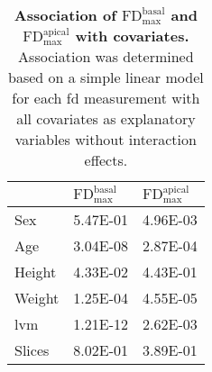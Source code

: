 \begin{table}[htbp]
  \centering
  \caption[\textbf{Association of \(\text{FD}_\text{max}^\text{basal}\) and \(\text{FD}_\text{max}^\text{apical}\) with covariates. }]{\textbf{Association of \(\text{FD}_\text{max}^\text{basal}\) and \(\text{FD}_\text{max}^\text{apical}\) with covariates. } Association was determined based on a simple linear model for each \gls{fd} measurement with all covariates as explanatory variables without interaction effects.}
    \begin{tabular}{lll}
    \toprule
          &  \(\text{FD}_\text{max}^\text{basal}\) & \(\text{FD}_\text{max}^\text{apical}\) \\
    \midrule
    Sex   & \num{5.47E-01} & \num{4.96E-03} \\
    Age   & \num{3.04E-08} & \num{2.87E-04} \\
    Height & \num{4.33E-02} & \num{4.43E-01} \\
    Weight & \num{1.25E-04} & \num{4.55E-05} \\
    \gls{lvm}   & \num{1.21E-12} & \num{2.62E-03} \\
    Slices & \num{8.02E-01} & \num{3.89E-01} \\
    \bottomrule
    \end{tabular}%
  \label{tab:covariates-FD}%
  \vspace{-2mm}
\end{table}%